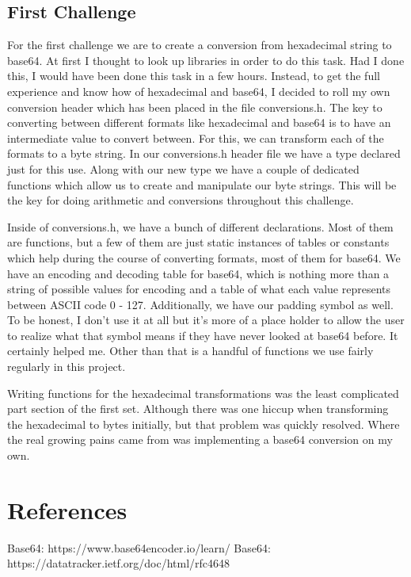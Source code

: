 \documentclass{report}
\begin{document}
	\subsection*{First Challenge}
		For the first challenge we are to create a conversion from hexadecimal string to base64. At first I thought to look up libraries in order to do this task. Had I done this, I would have been done this task in a few hours. Instead, to get the full experience and know how of hexadecimal and base64, I decided to roll my own conversion header which has been placed in the file conversions.h. The key to converting between different formats like hexadecimal and base64 is to have an intermediate value to convert between. For this, we can transform each of the formats to a byte string. In our conversions.h header file we have a type declared just for this use. Along with our new type we have a couple of dedicated functions which allow us to create and manipulate our byte strings. This will be the key for doing arithmetic and conversions throughout this challenge.
		\par
		Inside of conversions.h, we have a bunch of different declarations. Most of them are functions, but a few of them are just static instances of tables or constants which help during the course of converting formats, most of them for base64. We have an encoding and decoding table for base64, which is nothing more than a string of possible values for encoding and a table of what each value represents between ASCII code 0 - 127. Additionally, we have our padding symbol as well. To be honest, I don't use it at all but it's more of a place holder to allow the user to realize what that symbol means if they have never looked at base64 before. It certainly helped me. Other than that is a handful of functions we use fairly regularly in this project.
		\par 
		Writing functions for the hexadecimal transformations was the least complicated part section of the first set. Although there was one hiccup when transforming the hexadecimal to bytes initially, but that problem was quickly resolved. Where the real growing pains came from was implementing a base64 conversion on my own.
		
		
	\pagebreak
	\section*{References}
		Base64: https://www.base64encoder.io/learn/ \newline
		Base64: https://datatracker.ietf.org/doc/html/rfc4648 \newline
	
\end{document}
